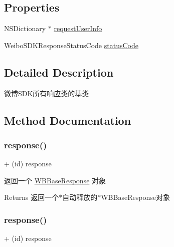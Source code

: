\subsection*{Properties}
\begin{DoxyCompactItemize}
\item 
N\+S\+Dictionary $\ast$ \mbox{\hyperlink{interface_w_b_base_response_ab0e1042b2da7e0301eba30c2231d36a8}{request\+User\+Info}}
\item 
Weibo\+S\+D\+K\+Response\+Status\+Code \mbox{\hyperlink{interface_w_b_base_response_a68f57eeafc84a0b04c4986f2be081c61}{status\+Code}}
\end{DoxyCompactItemize}


\subsection{Detailed Description}
微博\+S\+D\+K所有响应类的基类 

\subsection{Method Documentation}
\mbox{\label{interface_w_b_base_response_adbd83297d349925f1964bc854589da24}} 
\subsubsection{\texorpdfstring{response()}{response()}\hspace{0.1cm}{\footnotesize\ttfamily [1/3]}}
{\footnotesize\ttfamily + (id) response \begin{DoxyParamCaption}{ }\end{DoxyParamCaption}}

返回一个 \mbox{\hyperlink{interface_w_b_base_response}{W\+B\+Base\+Response}} 对象

\begin{DoxyReturn}{Returns}
返回一个$\ast$自动释放的$\ast$\+W\+B\+Base\+Response对象 
\end{DoxyReturn}
\mbox{\label{interface_w_b_base_response_adbd83297d349925f1964bc854589da24}} 
\subsubsection{\texorpdfstring{response()}{response()}\hspace{0.1cm}{\footnotesize\ttfamily [2/3]}}
{\footnotesize\ttfamily + (id) response \begin{DoxyParamCaption}{ }\end{DoxyParamCaption}}

